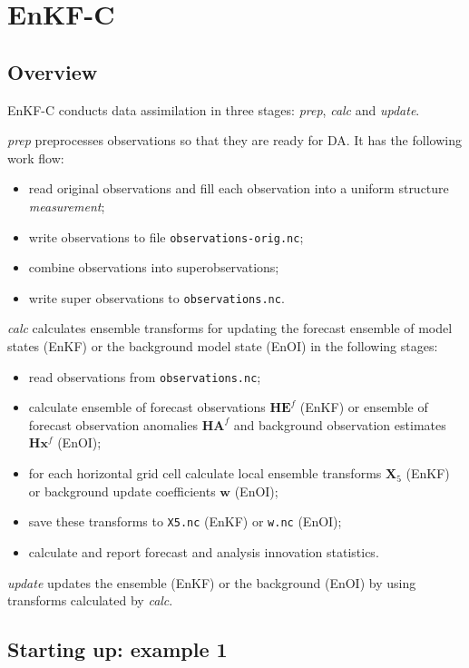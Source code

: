 \documentclass[11pt]{report}
\newcommand{\mb} {\mathbf}
\begin{document}
\chapter{EnKF-C}
\label{ch:enkf-c}

\section{Overview}

EnKF-C conducts data assimilation in three stages: \emph{prep}, \emph{calc} and \emph{update}.

\emph{prep} preprocesses observations so that they are ready for DA.
It has the following work flow:
\begin{itemize}
\item read original observations and fill each observation into a uniform structure \emph{measurement};
\item write observations to file \verb|observations-orig.nc|;
\item combine observations into superobservations;
\item write super observations to \verb|observations.nc|.
\end{itemize}

\emph{calc} calculates ensemble transforms for updating the forecast ensemble of model states (EnKF) or the background model state (EnOI) in the following stages:
\begin{itemize}
\item read observations from \verb|observations.nc|;
\item calculate ensemble of forecast observations $\mb H \mb E^f$ (EnKF) or ensemble of forecast observation anomalies $\mb H \mb A^f$ and background observation estimates $\mb H \mb x^f$ (EnOI);
\item for each horizontal grid cell calculate local ensemble transforms $\mb X_5$ (EnKF) or background update coefficients $\mb w$ (EnOI);
\item save these transforms to \verb|X5.nc| (EnKF) or \verb|w.nc| (EnOI);
\item calculate and report forecast and analysis innovation statistics.
\end{itemize}

\emph{update} updates the ensemble (EnKF) or the background (EnOI) by using transforms calculated by \emph{calc}.

\section{Starting up: example 1}
\label{example1}
\end{document}
